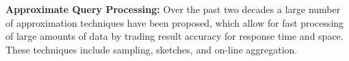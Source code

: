 \documentclass[conference]{IEEEtran}
\newcommand{\bi}{\begin{itemize}}
\newcommand{\ii}{\item}
\begin{document}
\noindent
\textbf{Approximate Query Processing:}
Over the past two decades a large number of approximation techniques have been proposed, which allow for fast processing of large amounts of data by trading result accuracy for response time and space. These techniques include sampling, sketches, and on-line aggregation.

%
%
\end{document}
